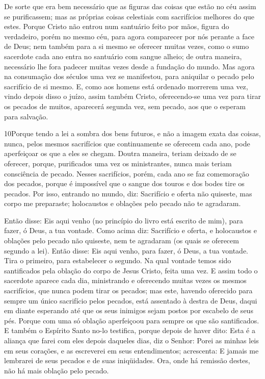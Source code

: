De sorte que era bem necessário que as figuras das coisas que
estão no céu assim se purificassem; mas as próprias coisas
celestiais com sacrifícios melhores do que estes. Porque
Cristo não entrou num santuário feito por mãos, figura do
verdadeiro, porém no mesmo céu, para agora comparecer por nós
perante a face de Deus; nem também para a si mesmo se
oferecer muitas vezes, como o sumo sacerdote cada ano entra no
santuário com sangue alheio; de outra maneira, necessário lhe
fora padecer muitas vezes desde a fundação do mundo. Mas agora na
consumação dos séculos uma vez se manifestou, para aniquilar o
pecado pelo sacrifício de si mesmo. E, como aos homens está
ordenado morrerem uma vez, vindo depois disso o juízo, assim
também Cristo, oferecendo-se uma vez para tirar os pecados de
muitos, aparecerá segunda vez, sem pecado, aos que o esperam para
salvação.

\medskip

\lettrine{10} Porque tendo a lei a sombra dos bens futuros, e
não a imagem exata das coisas, nunca, pelos mesmos sacrifícios que
continuamente se oferecem cada ano, pode aperfeiçoar os que a eles
se chegam. Doutra maneira, teriam deixado de se oferecer,
porque, purificados uma vez os ministrantes, nunca mais teriam
consciência de pecado. Nesses sacrifícios, porém, cada ano se
faz comemoração dos pecados, porque é impossível que o sangue
dos touros e dos bodes tire os pecados. Por isso, entrando no
mundo, diz: Sacrifício e oferta não quiseste, mas corpo me
preparaste; holocaustos e oblações pelo pecado não te agradaram.

Então disse: Eis aqui venho (no princípio do livro está escrito de
mim), para fazer, ó Deus, a tua vontade. Como acima diz:
Sacrifício e oferta, e holocaustos e oblações pelo pecado não
quiseste, nem te agradaram (os quais se oferecem segundo a lei).
Então disse: Eis aqui venho, para fazer, ó Deus, a tua vontade.
Tira o primeiro, para estabelecer o segundo. Na qual vontade
temos sido santificados pela oblação do corpo de Jesus Cristo, feita
uma vez. E assim todo o sacerdote aparece cada dia,
ministrando e oferecendo muitas vezes os mesmos sacrifícios, que
nunca podem tirar os pecados; mas este, havendo oferecido
para sempre um único sacrifício pelos pecados, está assentado à
destra de Deus, daqui em diante esperando até que os seus
inimigos sejam postos por escabelo de seus pés. Porque com
uma só oblação aperfeiçoou para sempre os que são santificados.
E também o Espírito Santo no-lo testifica, porque depois de
haver dito: Esta é a aliança que farei com eles depois
daqueles dias, diz o Senhor: Porei as minhas leis em seus corações,
e as escreverei em seus entendimentos; acrescenta: E jamais
me lembrarei de seus pecados e de suas iniqüidades. Ora, onde
há remissão destes, não há mais oblação pelo pecado.

